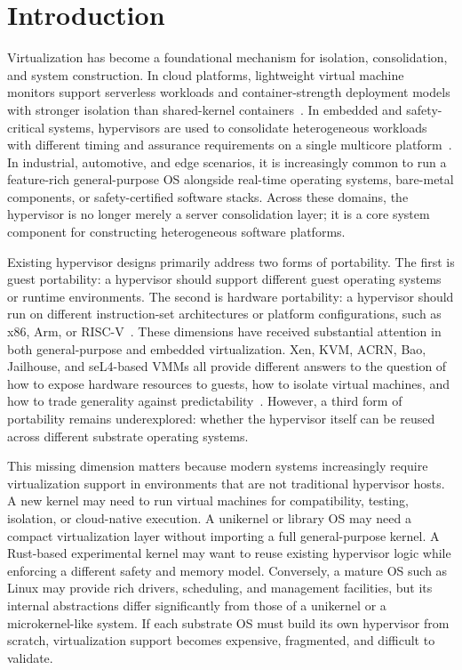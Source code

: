\section{Introduction}

Virtualization has become a foundational mechanism for isolation, consolidation, and system construction. In cloud platforms, lightweight virtual machine monitors support serverless workloads and container-strength deployment models with stronger isolation than shared-kernel containers~\cite{holmes2024severifast,goethals2022functional}. In embedded and safety-critical systems, hypervisors are used to consolidate heterogeneous workloads with different timing and assurance requirements on a single multicore platform~\cite{lozano2023comprehensive,cilardo2022virtualization}. In industrial, automotive, and edge scenarios, it is increasingly common to run a feature-rich general-purpose OS alongside real-time operating systems, bare-metal components, or safety-certified software stacks. Across these domains, the hypervisor is no longer merely a server consolidation layer; it is a core system component for constructing heterogeneous software platforms.

Existing hypervisor designs primarily address two forms of portability. The first is guest portability: a hypervisor should support different guest operating systems or runtime environments. The second is hardware portability: a hypervisor should run on different instruction-set architectures or platform configurations, such as x86, Arm, or RISC-V~\cite{s2021first,sousa2024hspv}. These dimensions have received substantial attention in both general-purpose and embedded virtualization. Xen, KVM, ACRN, Bao, Jailhouse, and seL4-based VMMs all provide different answers to the question of how to expose hardware resources to guests, how to isolate virtual machines, and how to trade generality against predictability~\cite{li2019acrn,martins2020lightweight,martins2023shedding}. However, a third form of portability remains underexplored: whether the hypervisor itself can be reused across different substrate operating systems.

This missing dimension matters because modern systems increasingly require virtualization support in environments that are not traditional hypervisor hosts. A new kernel may need to run virtual machines for compatibility, testing, isolation, or cloud-native execution. A unikernel or library OS may need a compact virtualization layer without importing a full general-purpose kernel. A Rust-based experimental kernel may want to reuse existing hypervisor logic while enforcing a different safety and memory model. Conversely, a mature OS such as Linux may provide rich drivers, scheduling, and management facilities, but its internal abstractions differ significantly from those of a unikernel or a microkernel-like system. If each substrate OS must build its own hypervisor from scratch, virtualization support becomes expensive, fragmented, and difficult to validate.

